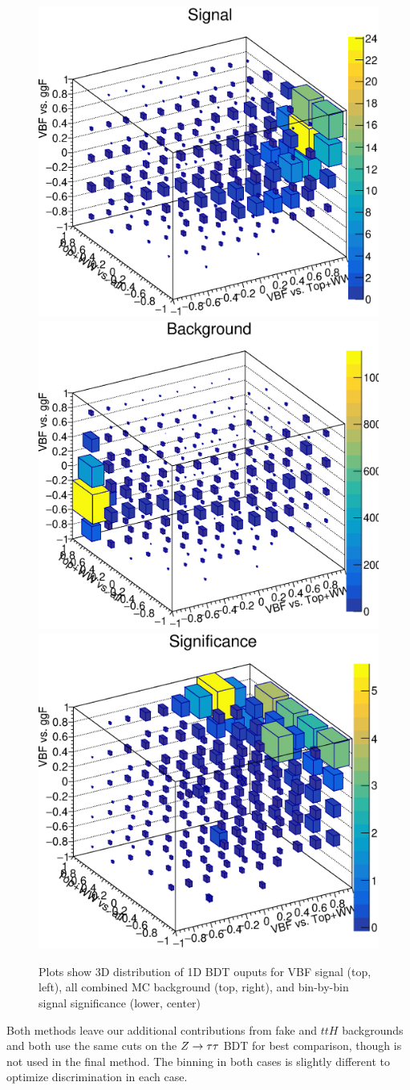 \begin{figure}[!htbp]
\centering
\includegraphics[width=.4\linewidth]{Pictures/finalBDT_def/Signalfull_1D_simp.eps} \quad
\includegraphics[width=.4\linewidth]{Pictures/finalBDT_def/Backgroundfull_1D_simp.eps}
\medskip
\includegraphics[width=.4\linewidth]{Pictures/finalBDT_def/Significancefull_1D_simp.eps} \quad
\caption{Plots show 3D distribution of 1D BDT ouputs for VBF signal (top, left), all combined MC background (top, right), and bin-by-bin signal significance (lower, center)}
\label{fig:1Das3D}
\end{figure}

Both methods leave our additional contributions from fake and $ttH$ backgrounds and both use the same cuts on the $Z\rightarrow\tau\tau$ BDT for best comparison, though is not used in the final method. The binning in both cases is slightly different to optimize discrimination in each case. 

